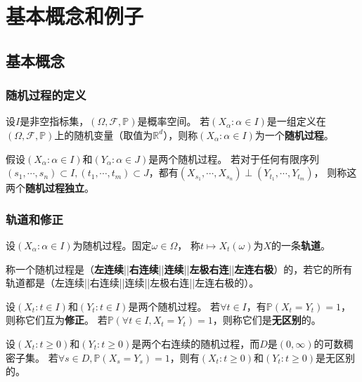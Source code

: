 \documentclass[main]{subfiles}
\begin{document}
\section{基本概念和例子}
\subsection{基本概念}
\subsubsection{随机过程的定义}
\begin{definition}\label{def:stochestic_progress}
  设\(I\)是非空指标集，\((\Omega,\mathcal{F},\mathbb{P})\)是概率空间。
  若\((X_\alpha:\alpha \in I)\)是一组定义在\((\Omega,\mathcal{F},\mathbb{P})\)上的随机变量（取值为\(\mathbb{R}^d\)），则称\((X_\alpha:\alpha \in I)\)为一个\textbf{随机过程}。
\end{definition}
\begin{definition}\label{def:independent_of_stochestic_progress}
  假设\((X_\alpha:\alpha \in I)\)和\((Y_\alpha:\alpha \in J)\)是两个随机过程。
  若对于任何有限序列\((s_1,\cdots,s_n) \subset I,(t_1,\cdots,t_m) \subset J\)，都有\((X_{s_1},\cdots,X_{s_n}) \perp (Y_{t_1},\cdots,Y_{t_m})\)，
  则称这两个\textbf{随机过程独立}。
\end{definition}
\subsubsection{轨道和修正}
\begin{definition}\label{def:path}
  设\((X_\alpha:\alpha \in I)\)为随机过程。固定\(\omega \in \Omega\)，
  称\(t \mapsto X_{t}(\omega)\)为\(X\)的一条\textbf{轨道}。
\end{definition}
\begin{definition}\label{def:continous}
  称一个随机过程是（\textbf{左连续}||\textbf{右连续}||\textbf{连续}||\textbf{左极右连}||\textbf{左连右极}）的，若它的所有轨道都是（左连续||右连续||连续||左极右连||左连右极的）。
\end{definition}
\begin{definition}\label{def:same}
  设\((X_t:t \in I)\)和\((Y_t:t \in I)\)是两个随机过程。
  若\(\forall t \in I\)，有\(\mathbb{P}(X_t=Y_t)=1\)，则称它们互为\textbf{修正}。
  若\(\mathbb{P}(\forall t \in I,X_t=Y_t)=1\)，则称它们是\textbf{无区别}的。
\end{definition}
\begin{theorem}\label{the:1}
  设\((X_t:t \geq 0)\)和\((Y_t:t \geq 0)\)是两个右连续的随机过程，而\(D\)是\((0,\infty)\)的可数稠密子集。
  若\(\forall s \in D,\mathbb{P}(X_s=Y_s)=1\)，则有\((X_t:t \geq 0)\)和\((Y_t:t \geq 0)\)是无区别的。
\end{theorem}
\end{document}
